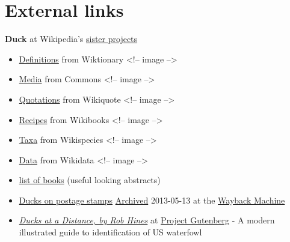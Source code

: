 \documentclass[11pt,a4paper]{article}
\begin{document}
\section{External links}

\textbf{Duck} at Wikipedia's \href{/wiki/Wikipedia:Wikimedia\_sister\_projects}{sister projects}

\begin{itemize}
\item \href{https://en.wiktionary.org/wiki/duck}{Definitions} from Wiktionary
<!-- image -->
\item \href{https://commons.wikimedia.org/wiki/Anatidae}{Media} from Commons
<!-- image -->
\item \href{https://en.wikiquote.org/wiki/Birds}{Quotations} from Wikiquote
<!-- image -->
\item \href{https://en.wikibooks.org/wiki/Cookbook:Duck}{Recipes} from Wikibooks
<!-- image -->
\item \href{https://species.wikimedia.org/wiki/Anatidae}{Taxa} from Wikispecies
<!-- image -->
\item \href{https://www.wikidata.org/wiki/Q3736439}{Data} from Wikidata
<!-- image -->
\end{itemize}

\begin{itemize}
\item \href{https://web.archive.org/web/20060613210555/http://seaducks.org/subjects/MIGRATION\%20AND\%20FLIGHT.htm}{list of books} (useful looking abstracts)
\item \href{http://www.stampsbook.org/subject/Duck.html}{Ducks on postage stamps} \href{https://web.archive.org/web/20130513022903/http://www.stampsbook.org/subject/Duck.html}{Archived} 2013-05-13 at the \href{/wiki/Wayback\_Machine}{Wayback Machine}
\item \href{https://gutenberg.org/ebooks/18884}{\textit{Ducks at a Distance, by Rob Hines}} at \href{/wiki/Project\_Gutenberg}{Project Gutenberg} - A modern illustrated guide to identification of US waterfowl
\end{itemize}
\end{document}
